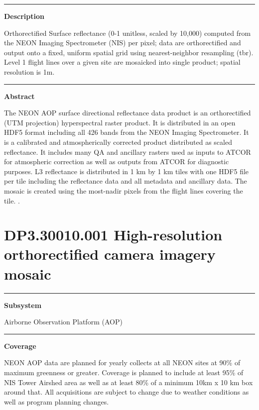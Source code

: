 \documentclass[]{article}
\begin{document}
\begin{center}\rule{0.5\linewidth}{\linethickness}\end{center}

\textbf{Description}

Orthorectified Surface reflectance (0-1 unitless, scaled by 10,000)
computed from the NEON Imaging Spectrometer (NIS) per pixel; data are
orthorectified and output onto a fixed, uniform spatial grid using
nearest-neighbor resampling (tbr). Level 1 flight lines over a given
site are mosaicked into single product; spatial resolution is 1m.

\begin{center}\rule{0.5\linewidth}{\linethickness}\end{center}

\textbf{Abstract}

The NEON AOP surface directional reflectance data product is an
orthorectified (UTM projection) hyperspectral raster product. It is
distributed in an open HDF5 format including all 426 bands from the NEON
Imaging Spectrometer. It is a calibrated and atmospherically corrected
product distributed as scaled reflectance. It includes many QA and
ancillary rasters used as inputs to ATCOR for atmospheric correction as
well as outputs from ATCOR for diagnostic purposes. L3 reflectance is
distributed in 1 km by 1 km tiles with one HDF5 file per tile including
the reflectance data and all metadata and ancillary data. The mosaic is
created using the most-nadir pixels from the flight lines covering the
tile. \newpage
.

\section{DP3.30010.001 High-resolution orthorectified camera imagery
mosaic}\label{dp3.30010.001-high-resolution-orthorectified-camera-imagery-mosaic}

\begin{center}\rule{0.5\linewidth}{\linethickness}\end{center}

\textbf{Subsystem}

Airborne Observation Platform (AOP)

\begin{center}\rule{0.5\linewidth}{\linethickness}\end{center}

\textbf{Coverage}

NEON AOP data are planned for yearly collects at all NEON sites at 90\%
of maximum greenness or greater. Coverage is planned to include at least
95\% of NIS Tower Airshed area as well as at least 80\% of a minimum
10km x 10 km box around that. All acquisitions are subject to change due
to weather conditions as well as program planning changes.
\end{document}
